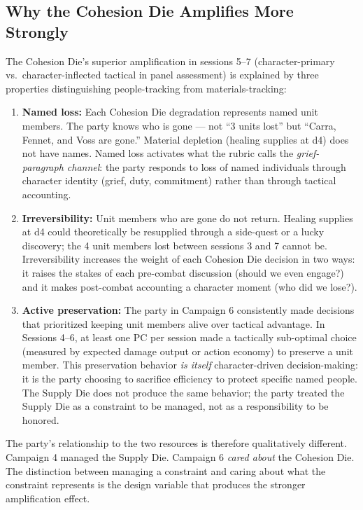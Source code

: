 \subsection{Why the Cohesion Die Amplifies More Strongly}

The Cohesion Die's superior amplification in sessions 5--7 (character-primary vs.\
character-inflected tactical in panel assessment) is explained by three properties
distinguishing people-tracking from materials-tracking:

\begin{enumerate}
  \item \textbf{Named loss:} Each Cohesion Die degradation represents named unit members.
    The party knows who is gone --- not ``3 units lost'' but ``Carra, Fennet, and Voss
    are gone.'' Material depletion (healing supplies at d4) does not have names. Named
    loss activates what the rubric calls the \textit{grief-paragraph channel}: the party
    responds to loss of named individuals through character identity (grief, duty,
    commitment) rather than through tactical accounting.

  \item \textbf{Irreversibility:} Unit members who are gone do not return. Healing supplies
    at d4 could theoretically be resupplied through a side-quest or a lucky discovery;
    the 4 unit members lost between sessions 3 and 7 cannot be. Irreversibility
    increases the weight of each Cohesion Die decision in two ways: it raises the stakes
    of each pre-combat discussion (should we even engage?) and it makes post-combat
    accounting a character moment (who did we lose?).

  \item \textbf{Active preservation:} The party in Campaign 6 consistently made decisions
    that prioritized keeping unit members alive over tactical advantage. In Sessions 4--6,
    at least one PC per session made a tactically sub-optimal choice (measured by expected
    damage output or action economy) to preserve a unit member. This preservation behavior
    \textit{is itself} character-driven decision-making: it is the party choosing to
    sacrifice efficiency to protect specific named people. The Supply Die does not produce
    the same behavior; the party treated the Supply Die as a constraint to be managed, not
    as a responsibility to be honored.
\end{enumerate}

The party's relationship to the two resources is therefore qualitatively different.
Campaign 4 managed the Supply Die. Campaign 6 \textit{cared about} the Cohesion Die.
The distinction between managing a constraint and caring about what the constraint
represents is the design variable that produces the stronger amplification effect.

